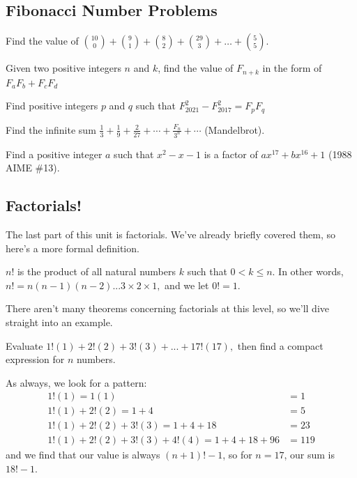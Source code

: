 \documentclass[11pt]{article}
\newcommand{\important}{$\blacktriangleright\,$}
\begin{document}
\subsection*{Fibonacci Number Problems}
\begin{problem}[\important 10]
    Find the value of $\binom{10}{0} + \binom{9}{1} + \binom{8}{2} + \binom{29}{3} + \dots + \binom{5}{5}$.
\end{problem}
\begin{problem}[\important 20]
    Given two positive integers $n$ and $k$, find the value of $F_{n+k}$ in the form of $F_aF_b+F_cF_d$
\end{problem}
\begin{problem}[15]
    Find positive integers $p$ and $q$ such that $F_{2021}^2 - F_{2017}^2 = F_pF_q$
\end{problem}
\begin{problem}[30]
    Find the infinite sum $\frac{1}{3} + \frac{1}{9} + \frac{2}{27} + \cdots + \frac{F_n}{3^n} + \cdots$ (Mandelbrot).
\end{problem}
\begin{problem}[35]
    Find a positive integer $a$ such that $x^2 - x - 1$ is a factor of $ax^{17} + bx^{16} + 1$ (1988 AIME \#13).
\end{problem}

\subsection{Factorials!}
The last part of this unit is factorials. We've already briefly covered them, so here's a more formal definition.

\begin{defn}
	$n!$ is the product of all natural numbers $k$ such that $0 < k \leq n$. In other words, $n! = n(n-1)(n-2)...3\times2\times1,$ and we let $0! = 1$.
\end{defn}
There aren't many theorems concerning factorials at this level, so we'll dive straight into an example.

\begin{example}
	Evaluate $1!(1) + 2!(2) + 3!(3) + ... + 17!(17),$ then find a compact expression for $n$ numbers.
\end{example}
\begin{solution} As always, we look for a pattern:
\begin{align*}
	1!(1) = 1(1) &= 1 \\
	1!(1) + 2!(2) = 1 + 4 &= 5 \\
	1!(1) + 2!(2) + 3!(3) = 1 + 4  + 18 &= 23 \\
	1!(1) + 2!(2) + 3!(3) + 4!(4) = 1 + 4  + 18 + 96 &= 119
\end{align*}
and we find that our value is always $(n+1)! - 1$, so for $n=17$, our sum is $\boxed{18!-1}.$
\end{solution}
\end{document}
